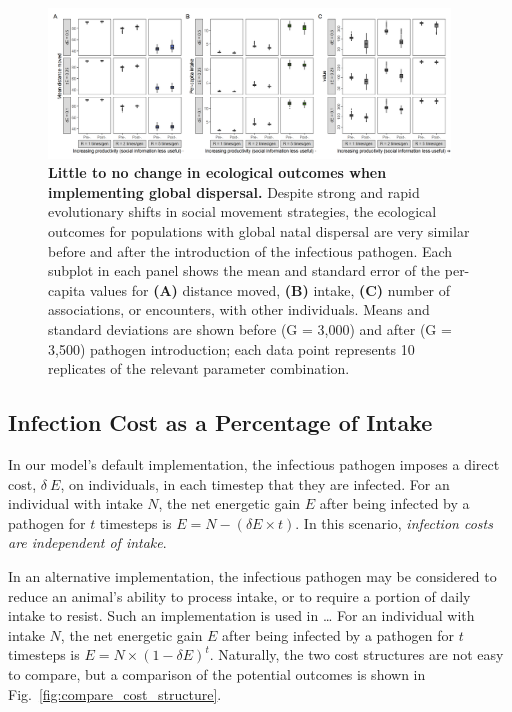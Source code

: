 \begin{figure}
    \centering
    \includegraphics[width=0.95\textwidth]{figures/pathomove/fig_eco_compare_global.png}
    \caption{
        \textbf{Little to no change in ecological outcomes when implementing global dispersal.} Despite strong and rapid evolutionary shifts in social movement strategies, the ecological outcomes for populations with global natal dispersal are very similar before and after the introduction of the infectious pathogen. Each subplot in each panel shows the mean and standard error of the per-capita values for \textbf{(A)} distance moved, \textbf{(B)} intake, \textbf{(C)} number of associations, or encounters, with other individuals. Means and standard deviations are shown before (G = 3,000) and after (G = 3,500) pathogen introduction; each data point represents 10 replicates of the relevant parameter combination.
    }\label{fig:patho_global_eco}
\end{figure}

\subsection*{Infection Cost as a Percentage of Intake}

In our model's default implementation, the infectious pathogen imposes a direct cost, $\delta~E$, on individuals, in each timestep that they are infected.
For an individual with intake $N$, the net energetic gain $E$ after being infected by a pathogen for $t$ timesteps is $E = N - (\delta E \times t)$.
In this scenario, \emph{infection costs are independent of intake}.

In an alternative implementation, the infectious pathogen may be considered to reduce an animal's ability to process intake, or to require a portion of daily intake to resist.
Such an implementation is used in \ldots{}
For an individual with intake $N$, the net energetic gain $E$ after being infected by a pathogen for $t$ timesteps is $E = N \times (1 - \delta E) ^ t$.
Naturally, the two cost structures are not easy to compare, but a comparison of the potential outcomes is shown in Fig.~\ref{fig:compare_cost_structure}.

